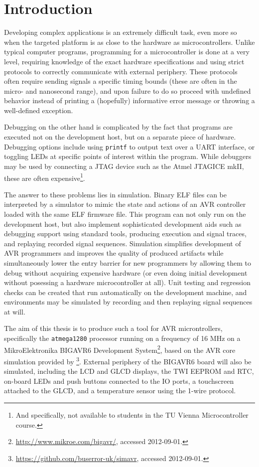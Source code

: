 
\chapter{Introduction} \label{chapter:introduction}

Developing complex applications is an extremely difficult task, even more so when
the targeted platform is as close to the hardware as microcontrollers. Unlike
typical computer programs, programming for a microcontroller is done at a very level,
requiring knowledge of the exact hardware specifications and using strict protocols
to correctly communicate with external periphery. These protocols often require
sending signals a specific timing bounds (these are often in the micro- and nanosecond
range), and upon failure to do so proceed with undefined behavior instead of
printing a (hopefully) informative error message or throwing a well-defined
exception.

Debugging on the other hand is complicated by the fact that programs are executed
not on the development host, but on a separate piece of hardware.
Debugging options include using \lstinline|printf| to output text
over a \ac{UART} interface, or toggling \acp{LED} at specific points of interest
within the program.
While debuggers may be used by connecting a \ac{JTAG} device such as the Atmel
JTAGICE mkII,
these are often expensive\footnote{
%
And specifically, not available to students in the \ac{TU} Vienna Microcontroller course.
%
}.

The answer to these problems lies in simulation. Binary \ac{ELF} files can be
interpreted by a simulator to mimic the state and actions of an \ac{AVR} controller
loaded with the same \ac{ELF} firmware file. This program can not only run on the development
host, but also implement sophisticated development aids such as debugging support
using standard tools, producing execution and signal traces, and replaying recorded
signal sequences. Simulation simplifies development of \ac{AVR} programmers and improves
the quality of produced artifacts while simultaneously lower the entry barrier
for new programmers by allowing them to debug without acquiring expensive
hardware (or even doing initial development without posessing a hardware microcontroller
at all). Unit testing and regression checks can be created that run automatically
on the development machine, and environments may be simulated by recording and then
replaying signal sequences at will.

The aim of this thesis is to produce such a tool for \ac{AVR} microntrollers,
specifically the \verb|atmega1280| processor running on a frequency of 16 \ac{MHz}
on a MikroElektronika BIGAVR6 Development System\footnote{
%
\url{http://www.mikroe.com/bigavr/}, accessed 2012-09-01.
%
}, based on the \ac{AVR} core simulation provided by \simavr\footnote{
%
\url{https://github.com/buserror-uk/simavr}, accessed 2012-09-01.
%
}. External periphery of the BIGAVR6 board will also be simulated, including
the \ac{LCD} and \ac{GLCD} displays, the \ac{TWI} \ac{EEPROM} and \ac{RTC},
on-board \acp{LED} and push buttons connected to the \ac{IO} ports, a touchscreen
attached to the \ac{GLCD}, and a temperature sensor using the 1-wire protocol.

